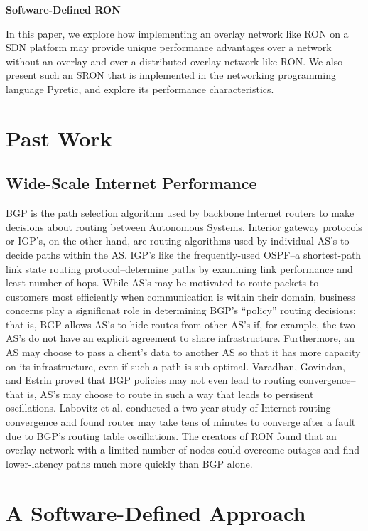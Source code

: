 \documentclass[pageno]{jpaper}
\begin{document}
{\bf Software-Defined RON}\bigskip

In this paper, we explore how implementing an overlay network like RON on a 
SDN platform may provide unique performance advantages over a network 
without an overlay and over a distributed overlay network like RON. We also
present such an SRON that is implemented in the networking programming language
Pyretic, and explore its performance characteristics.

\section{Past Work}

\subsection{Wide-Scale Internet Performance}
BGP is the path selection algorithm used by backbone Internet routers to make 
decisions about routing between Autonomous Systems.
Interior gateway protocols or IGP's, on the other hand, are routing algorithms used by individual
AS's to decide paths within the AS. IGP's like the frequently-used OSPF\cite{ospfrfc}--a shortest-path link
state routing protocol--determine paths by examining link performance and least
number of hops.  While AS's may be motivated to route packets to customers most 
efficiently when communication is within their domain, business concerns play a 
significnat role in determining BGP's ``policy'' routing decisions; that is, BGP
allows AS's to hide routes from other AS's if, for example, the two AS's do not have
an explicit agreement to share infrastructure.  Furthermore, an AS may choose to 
pass a client's data to another AS so that it has more capacity on its infrastructure,
even if such a path is sub-optimal.  Varadhan, Govindan, and Estrin proved that BGP
policies may not even lead to routing convergence--that is, AS's may choose to 
route in such a way that leads to persisent oscillations\cite{varadhan}.  Labovitz et al.\cite{labovitz}
conducted a two year study of Internet routing convergence and found router may take tens of minutes to converge after a fault due to BGP's routing table oscillations.  The creators of 
RON found that an overlay network with a limited number of nodes could overcome outages
and find lower-latency paths much more quickly than BGP alone.

\section{A Software-Defined Approach}
\end{document}
